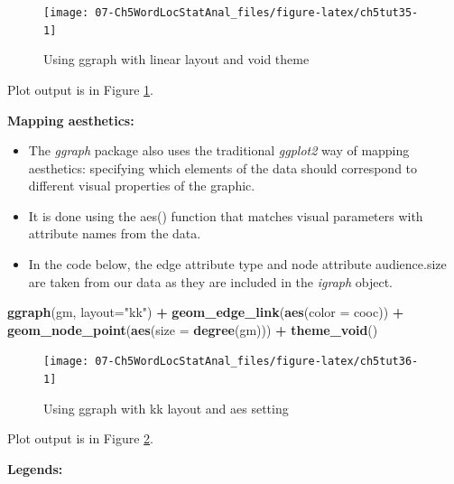\documentclass[
]{article}
\newenvironment{Shaded}{\begin{snugshade}}{\end{snugshade}}
\newcommand{\AttributeTok}[1]{\textcolor[rgb]{0.13,0.29,0.53}{#1}}
\newcommand{\FunctionTok}[1]{\textcolor[rgb]{0.13,0.29,0.53}{\textbf{#1}}}
\newcommand{\NormalTok}[1]{#1}
\newcommand{\SpecialCharTok}[1]{\textcolor[rgb]{0.81,0.36,0.00}{\textbf{#1}}}
\newcommand{\StringTok}[1]{\textcolor[rgb]{0.31,0.60,0.02}{#1}}
\providecommand{\tightlist}{%
  \setlength{\itemsep}{0pt}\setlength{\parskip}{0pt}}
\begin{document}
\begin{figure}

{\centering \texttt{[image: 07-Ch5WordLocStatAnal\_files/figure-latex/ch5tut35-1]} 

}

\caption{Using ggraph with linear layout and void theme}\label{fig:ch5tut35}
\end{figure}

Plot output is in Figure \ref{fig:ch5tut35}.

\textbf{Mapping aesthetics:}

\begin{itemize}
\tightlist
\item
  The \emph{ggraph} package also uses the traditional \emph{ggplot2} way of mapping aesthetics: specifying which elements of the data should correspond to different visual properties of the graphic.
\item
  It is done using the aes() function that matches visual parameters with attribute names from the data.
\item
  In the code below, the edge attribute type and node attribute audience.size are taken from our data as they are included in the \emph{igraph} object.
\end{itemize}

\begin{Shaded}
\begin{Highlighting}[]
\FunctionTok{ggraph}\NormalTok{(gm, }\AttributeTok{layout=}\StringTok{"kk"}\NormalTok{) }\SpecialCharTok{+}
  \FunctionTok{geom\_edge\_link}\NormalTok{(}\FunctionTok{aes}\NormalTok{(}\AttributeTok{color =}\NormalTok{ cooc)) }\SpecialCharTok{+}           
  \FunctionTok{geom\_node\_point}\NormalTok{(}\FunctionTok{aes}\NormalTok{(}\AttributeTok{size =} \FunctionTok{degree}\NormalTok{(gm))) }\SpecialCharTok{+}  
  \FunctionTok{theme\_void}\NormalTok{()}
\end{Highlighting}
\end{Shaded}

\begin{figure}

{\centering \texttt{[image: 07-Ch5WordLocStatAnal\_files/figure-latex/ch5tut36-1]} 

}

\caption{Using ggraph with kk layout and aes setting}\label{fig:ch5tut36}
\end{figure}

Plot output is in Figure \ref{fig:ch5tut36}.

\textbf{Legends:}
\end{document}
